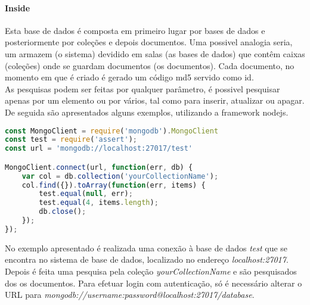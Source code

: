 \paragraph{Inside}
Esta base de dados é composta em primeiro lugar por bases de dados e posteriormente por coleções e depois documentos. Uma possivel analogia seria, um armazem (o sistema) devidido em salas (as bases de dados) que contêm caixas (coleções) onde se guardam documentos (os documentos). Cada documento, no momento em que é criado é gerado um código md5 servido como id.\newline \\
As pesquisas podem ser feitas por qualquer parâmetro, é possivel pesquisar apenas por um elemento ou por vários, tal como para inserir, atualizar ou apagar.\newline
De seguida são apresentados alguns exemplos, utilizando a framework nodejs.
\begin{lstlisting}[language=javascript]
const MongoClient = require('mongodb').MongoClient
const test = require('assert');
const url = 'mongodb://localhost:27017/test'

MongoClient.connect(url, function(err, db) {
    var col = db.collection('yourCollectionName');
    col.find({}).toArray(function(err, items) {
        test.equal(null, err);
        test.equal(4, items.length);
        db.close();
    });
});
\end{lstlisting}
No exemplo apresentado é realizada uma conexão à base de dados \textit{test} que se encontra no sistema de base de dados, localizado no endereço \textit{localhost:27017}.\newline
Depois é feita uma pesquisa pela coleção \textit{yourCollectionName} e são pesquisados dos os documentos.
Para efetuar login com autenticação, só é necessário alterar o URL para \textit{mongodb://username:password@localhost:27017/database}.
